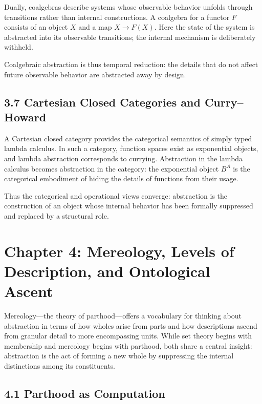 \documentclass[12pt,letterpaper]{article}
\begin{document}
Dually, coalgebras describe systems whose observable behavior unfolds through transitions rather than internal constructions. A coalgebra for a functor \(F\) consists of an object \(X\) and a map \(X \to F(X)\). Here the state of the system is abstracted into its observable transitions; the internal mechanism is deliberately withheld.

Coalgebraic abstraction is thus temporal reduction: the details that do not affect future observable behavior are abstracted away by design.

\subsection{3.7 Cartesian Closed Categories and Curry--Howard}

A Cartesian closed category provides the categorical semantics of simply typed lambda calculus. In such a category, function spaces exist as exponential objects, and lambda abstraction corresponds to currying. Abstraction in the lambda calculus becomes abstraction in the category: the exponential object \(B^A\) is the categorical embodiment of hiding the details of functions from their usage.

Thus the categorical and operational views converge: abstraction is the construction of an object whose internal behavior has been formally suppressed and replaced by a structural role.

\newpage

\section{Chapter 4: Mereology, Levels of Description, and Ontological Ascent}

Mereology—the theory of parthood—offers a vocabulary for thinking about abstraction in terms of how wholes arise from parts and how descriptions ascend from granular detail to more encompassing units. While set theory begins with membership and mereology begins with parthood, both share a central insight: abstraction is the act of forming a new whole by suppressing the internal distinctions among its constituents.

\subsection{4.1 Parthood as Computation}
\end{document}
